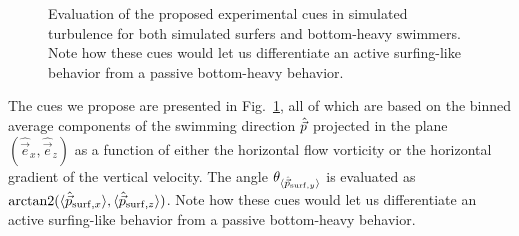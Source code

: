 \begin{figure}
	\centering
	
	\caption[Evaluation of the proposed experimental cues in simulated turbulence.]{
		Evaluation of the proposed experimental cues in simulated turbulence for both simulated surfers and bottom-heavy swimmers.
		Note how these cues would let us differentiate an active surfing-like behavior from a passive bottom-heavy behavior.
	}
	\label{fig:experimental_cues}
\end{figure}
The cues we propose are presented in Fig.~\ref{fig:experimental_cues}, all of which are based on the binned average components of the swimming direction $\hat{\vec{p}}$ projected in the plane $(\hat{\vec{e}}_x, \hat{\vec{e}}_z)$ as a function of either the horizontal flow vorticity or the horizontal gradient of the vertical velocity.
The angle $\theta _{\langle \hat{\vec{p}}_{\mathrm{surf}, y} \rangle}$ is evaluated as $\arctan2 (\langle \SwimmingDirection_{\mathrm{\NameSurfShort}, x} \rangle, \langle \SwimmingDirection_{\mathrm{\NameSurfShort}, \DirectionScalar} \rangle)$.
Note how these cues would let us differentiate an active surfing-like behavior from a passive bottom-heavy behavior.

% 

